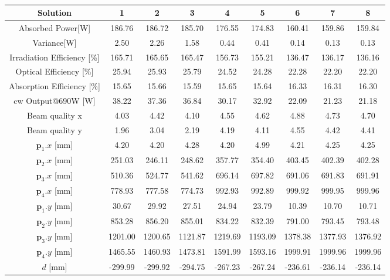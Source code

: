 \documentclass[a4paper,10pt]{article}
\renewcommand{\vec}[1]{\mathbf{#1}}
\begin{document}
    \begin{table}
    \centering
    \setlength\tabcolsep{2pt}
    \renewcommand{\arraystretch}{1.5}
    \begin{tabular}{| c | c | c | c | c | c | c | c | c |}
        \hline
        Solution      &1&2&3&4&5&6&7&8\\
        \hline
        Absorbed Power[W] &186.76&186.72&185.70&176.55&174.83&160.41&159.86&159.84\\
        \hline
        Variance[W] &2.50&2.26&1.58&0.44&0.41&0.14&0.13&0.13\\
        \hline
        Irradiation Efficiency [\%]&165.71&165.65&165.47&156.73&155.21&136.47&136.17&136.16\\
        \hline
        Optical Efficiency [\%]&25.94&25.93&25.79&24.52&24.28&22.28&22.20&22.20\\
        \hline
        Absorption Efficiency [\%]&15.65&15.66&15.59&15.65&15.64&16.33&16.31&16.30\\
        \hline
        cw Output@690W [W]  &38.22&37.36&36.84&30.17&32.92&22.09&21.23&21.18\\
        \hline
        Beam quality x&4.03&4.42&4.10&4.55&4.62&4.88&4.73&4.70\\
        \hline
        Beam quality y&1.96&3.04&2.19&4.19&4.11&4.55&4.42&4.41\\
        \hline
        $\vec{p}_1.x$ [mm] &4.20&4.20&4.28&4.20&4.99&4.21&4.25&4.25\\
        \hline
        $\vec{p}_2.x$ [mm] &251.03&246.11&248.62&357.77&354.40&403.45&402.39&402.28\\
        \hline
        $\vec{p}_3.x$ [mm] &510.36&524.77&541.62&696.14&697.82&691.06&691.83&691.91\\ 
        \hline
        $\vec{p}_4.x$ [mm] &778.93&777.58&774.73&992.93&992.89&999.92&999.95&999.96\\ 
        \hline
        $\vec{p}_1.y$ [mm] &30.67&29.92&27.51&24.94&23.79&10.39&10.70&10.71\\
        \hline
        $\vec{p}_2.y$ [mm] &853.28&856.20&855.01&834.22&832.39&791.00&793.45&793.48\\
        \hline
        $\vec{p}_3.y$ [mm] &1201.00&1200.65&1121.87&1219.69&1193.09&1378.38&1377.93&1376.92\\ 
        \hline
        $\vec{p}_4.y$ [mm] &1465.55&1460.93&1473.81&1591.99&1593.16&1999.91&1999.96&1999.96\\ 
        \hline
        $d$           [mm] &-299.99&-299.92&-294.75&-267.23&-267.24&-236.61&-236.14&-236.14\\
        \hline
    \end{tabular}
    \label{tab:setup2_results}
    \caption[]{}
    \end{table}
\end{document}
